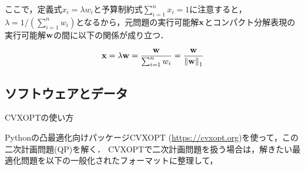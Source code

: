                                                                                                                                             ここで，定義式$x_i = \lambda w_i$と予算制約式$\sum_{i=1}^{n} x_i = 1$に注意すると，$\lambda = 1/(\sum_{i=1}^{n} w_i)$となるから，元問題の実行可能解$\bf x$とコンパクト分解表現の実行可能解$\bf w$の間に以下の関係が成り立つ．

                                                                                                                                            \begin{align}
                                                                                                                                                {\bf x} = \lambda {\bf w} =  \frac{\bf w}{\sum_{i=1}^{n} w_i} = \frac{\bf w}{{\|{\bf w}\|}_1}
                                                                                                                                                \end{align}


                                                                                                                                                \subsection{ソフトウェアとデータ}

                                                                                                                                                CVXOPTの使い方

                                                                                                                                                Pythonの凸最適化向けパッケージCVXOPT (\url{https://cvxopt.org})を使って，この二次計画問題(QP)を解く．
                                                                                                                                                CVXOPTで二次計画問題を扱う場合は，解きたい最適化問題を以下の一般化されたフォーマットに整理して，


